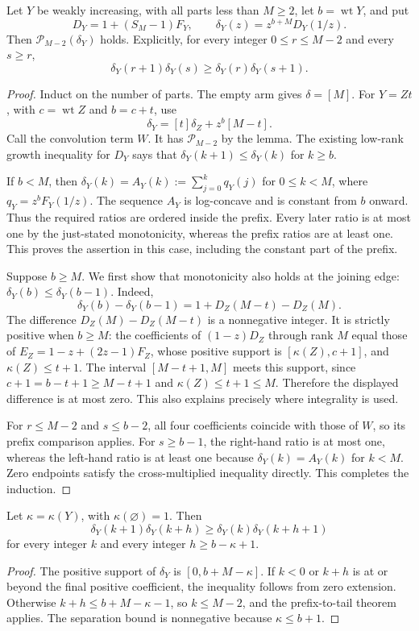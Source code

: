 \begin{theorem}
Let $Y$ be weakly increasing, with all parts less than $M\ge2$, let
$b=\operatorname{wt}Y$, and put
\[
 D_Y=1+(S_M-1)F_Y,\qquad \delta_Y(z)=z^{b+M}D_Y(1/z).
\]
Then $\mathcal P_{M-2}(\delta_Y)$ holds. Explicitly, for every integer
$0\le r\le M-2$ and every $s\ge r$,
\[
 \delta_Y(r+1)\delta_Y(s)\ge
 \delta_Y(r)\delta_Y(s+1).
\]
\end{theorem}
\begin{proof}
Induct on the number of parts. The empty arm gives $\delta=[M]$.
For $Y=Zt$, with $c=\operatorname{wt}Z$ and $b=c+t$, use
\[
 \delta_Y=[t]\delta_Z+z^b[M-t].
\]
Call the convolution term $W$. It has $\mathcal P_{M-2}$ by the lemma.
The existing low-rank growth inequality for $D_Y$ says that
$\delta_Y(k+1)\le\delta_Y(k)$ for $k\ge b$.

If $b<M$, then $\delta_Y(k)=A_Y(k):=\sum_{j=0}^kq_Y(j)$ for
$0\le k<M$, where $q_Y=z^bF_Y(1/z)$. The sequence $A_Y$ is
log-concave and is constant from $b$ onward. Thus the required ratios
are ordered inside the prefix. Every later ratio is at most one by
the just-stated monotonicity, whereas the prefix ratios are at least
one. This proves the assertion in this case, including the constant
part of the prefix.

Suppose $b\ge M$. We first show that monotonicity also holds at the
joining edge: $\delta_Y(b)\le\delta_Y(b-1)$. Indeed,
\[
 \delta_Y(b)-\delta_Y(b-1)=1+D_Z(M-t)-D_Z(M).
\]
The difference $D_Z(M)-D_Z(M-t)$ is a nonnegative integer. It is
strictly positive when $b\ge M$: the coefficients of
$(1-z)D_Z$ through rank $M$ equal those of
$E_Z=1-z+(2z-1)F_Z$, whose positive support is
$[\kappa(Z),c+1]$, and $\kappa(Z)\le t+1$. The interval
$[M-t+1,M]$ meets this support, since $c+1=b-t+1\ge M-t+1$ and
$\kappa(Z)\le t+1\le M$. Therefore the displayed difference is at
most zero. This also explains precisely where integrality is used.

For $r\le M-2$ and $s\le b-2$, all four coefficients coincide with
those of $W$, so its prefix comparison applies. For $s\ge b-1$,
the right-hand ratio is at most one, whereas the left-hand ratio is
at least one because $\delta_Y(k)=A_Y(k)$ for $k<M$. Zero endpoints
satisfy the cross-multiplied inequality directly. This completes
the induction.
\end{proof}

\begin{corollary}
Let $\kappa=\kappa(Y)$, with $\kappa(\varnothing)=1$. Then
\[
 \delta_Y(k+1)\delta_Y(k+h)\ge
 \delta_Y(k)\delta_Y(k+h+1)
\]
for every integer $k$ and every integer $h\ge b-\kappa+1$.
\end{corollary}
\begin{proof}
The positive support of $\delta_Y$ is $[0,b+M-\kappa]$.
If $k<0$ or $k+h$ is at or beyond the final positive coefficient,
the inequality follows from zero extension. Otherwise
$k+h\le b+M-\kappa-1$, so $k\le M-2$, and the prefix-to-tail
theorem applies. The separation bound is nonnegative because
$\kappa\le b+1$.
\end{proof}

